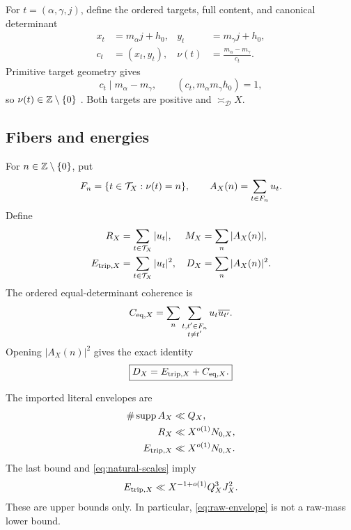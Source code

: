 For \(t=(\alpha,\gamma,j)\), define the ordered targets, full content,
and canonical determinant
\begin{equation}
\begin{aligned}
 x_t&=m_\alpha j+h_0,&
 y_t&=m_\gamma j+h_0,\\
 c_t&=(x_t,y_t),&
 \nu(t)&=\frac{m_\alpha-m_\gamma}{c_t}.
\end{aligned}
\label{eq:native-targets}
\end{equation}
Primitive target geometry gives
\[
 c_t\mid m_\alpha-m_\gamma,\qquad
 (c_t,m_\alpha m_\gamma h_0)=1,
\]
so \(\nu(t)\in\mathbb Z\setminus\{0\}\)
\citep{WangTPC30,WangTPC31}.  Both targets are positive and
\(\asymp_{\mathscr D}X\).

\subsection{Fibers and energies}

For \(n\in\mathbb Z\setminus\{0\}\), put
\begin{equation}
 F_n=\{t\in\mathcal T_X:\nu(t)=n\},\qquad
 A_X(n)=\sum_{t\in F_n}u_t.
\label{eq:fiber-coefficient}
\end{equation}
Define
\begin{equation}
\begin{aligned}
 R_X&=\sum_{t\in\mathcal T_X}|u_t|,&
 M_X&=\sum_n|A_X(n)|,\\
 E_{{\rm trip},X}&=\sum_{t\in\mathcal T_X}|u_t|^2,&
 D_X&=\sum_n|A_X(n)|^2.
\end{aligned}
\label{eq:global-statistics}
\end{equation}
The ordered equal-determinant coherence is
\begin{equation}
 C_{\mathrm{eq},X}
 =
 \sum_n
 \sum_{\substack{t,t'\in F_n\\t\ne t'}}
 u_t\overline{u_{t'}}.
\label{eq:equal-coherence}
\end{equation}
Opening \(|A_X(n)|^2\) gives the exact identity
\begin{equation}
 \boxed{D_X=E_{{\rm trip},X}+C_{\mathrm{eq},X}.}
\label{eq:D-E-C}
\end{equation}

The imported literal envelopes are
\begin{align}
 \#\operatorname{supp} A_X&\ll Q_X,\label{eq:support-envelope}\\
 R_X&\ll X^{o(1)}N_{0,X},\label{eq:raw-envelope}\\
 E_{{\rm trip},X}&\ll X^{o(1)}N_{0,X}.
\label{eq:Etrip-envelope}
\end{align}
The last bound and \eqref{eq:natural-scales} imply
\begin{equation}
 E_{{\rm trip},X}
 \ll X^{-1+o(1)}Q_X^3J_X^2.
\label{eq:Etrip-loss-one}
\end{equation}
These are upper bounds only.  In particular,
\eqref{eq:raw-envelope} is not a raw-mass lower bound.
